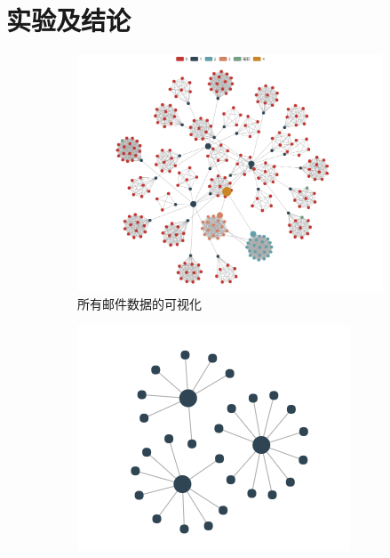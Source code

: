 \documentclass[journal]{vgtc}                %
\begin{document}
\section{实验及结论}
\begin{figure}
	\centering
	\begin{subfigure}{0.9\linewidth} %
		\includegraphics[width=\textwidth]{pictures/5-1.png}
		\caption{所有邮件数据的可视化} %
		\label{fig:all_category}
	\end{subfigure}
	\begin{subfigure}{0.3\linewidth} 
		\includegraphics[width=\linewidth]{pictures/5-2.png}

\end{subfigure}
\end{figure}
\end{document}
